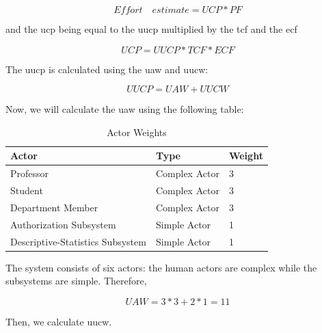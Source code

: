 \documentclass[11pt]{article}
\begin{document}
$$ Effort\quad estimate = UCP * PF $$

and the \gls{ucp} being equal to the \gls{uucp} multiplied by the \gls{tcf} and the \gls{ecf}

$$ UCP = UUCP * TCF * ECF $$

The \gls{uucp} is calculated using the \gls{uaw} and \gls{uucw}:

$$ UUCP = UAW + UUCW $$

Now, we will calculate the \gls{uaw} using the following table:

\begin{table}[ht!]
\centering
\caption{Actor Weights}
\begin{tabular}{|l|l|l|}
\hline
Actor                            & Type          & Weight \\ \hline
Professor                        & Complex Actor & 3      \\ \hline
Student                          & Complex Actor & 3      \\ \hline
Department Member                & Complex Actor & 3      \\ \hline
Authorization Subsystem          & Simple Actor  & 1      \\ \hline
Descriptive-Statistics Subsystem & Simple Actor  & 1      \\ \hline
\end{tabular}%
\end{table}

The system consists of six actors: the human actors are complex while the subsystems are simple. Therefore,

$$ UAW = 3 * 3 + 2 * 1 = 11 $$

\newpage

Then, we calculate \gls{uucw}.
\end{document}
